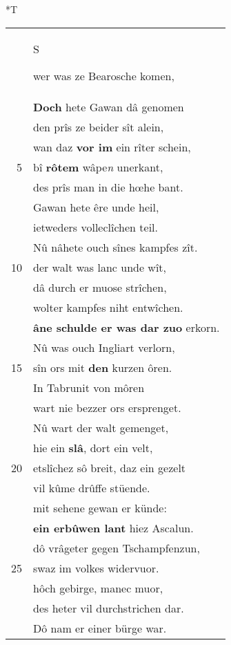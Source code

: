 \documentclass[8pt,a4paper,notitlepage]{article}
\begin{document}
\begin{table}[ht]
\begin{minipage}[t]{0.5\linewidth}
\end{minipage}
\hspace{0.5cm}
\begin{minipage}[t]{0.5\linewidth}
\small
\begin{center}*T
\end{center}
\begin{tabular}{rl}
 & \begin{Large}S\end{Large}wer was ze Bearosche komen,\\ 
 & \textbf{Doch} hete Gawan dâ genomen\\ 
 & den prîs ze beider sît alein,\\ 
 & wan daz \textbf{vor im} ein rîter schein,\\ 
5 & bî \textbf{rôtem} wâpe\textit{n} unerkant,\\ 
 & des prîs man in die hœhe bant.\\ 
 & Gawan hete êre unde heil,\\ 
 & ietweders volleclîchen teil.\\ 
 & Nû nâhete ouch sînes kampfes zît.\\ 
10 & der walt was lanc unde wît,\\ 
 & dâ durch er muose strîchen,\\ 
 & wolter kampfes niht entwîchen.\\ 
 & \textbf{âne schulde er was dar zuo} erkorn.\\ 
 & Nû was ouch Ingliart verlorn,\\ 
15 & sîn ors mit \textbf{den} kurzen ôren.\\ 
 & In Tabrunit von môren\\ 
 & wart nie bezzer ors ersprenget.\\ 
 & Nû wart der walt gemenget,\\ 
 & hie ein \textbf{slâ}, dort ein velt,\\ 
20 & etslîchez sô breit, daz ein gezelt\\ 
 & vil kûme drûffe stüende.\\ 
 & mit sehene gewan er künde:\\ 
 & \textbf{ein erbûwen lant} hiez Ascalun.\\ 
 & dô vrâgeter gegen Tschampfenzun,\\ 
25 & swaz im volkes widervuor.\\ 
 & hôch gebirge, manec muor,\\ 
 & des heter vil durchstrichen dar.\\ 
 & Dô nam er einer bürge war.\\ 

\end{tabular}
\end{minipage}
\end{table}
\end{document}
